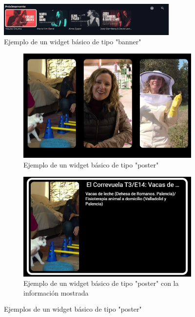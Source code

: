 \begin{figure}[hp!]
    \centering
    \includegraphics[width=0.8\textwidth]{imaxes/Widget_banner.png}
    \caption{Ejemplo de un widget básico de tipo "banner"}
    \label{fig:Widget_banner}
\end{figure}
\begin{figure}[hp!]
    \begin{subfigure}[c]{0.5\textwidth}
        \includegraphics[width=\textwidth]{imaxes/Widget_poster.png}
        \caption{Ejemplo de un widget básico de tipo "poster"}
        \label{fig:Widget_destacado}
    \end{subfigure}
    \hspace{0.1\textwidth}
    \begin{subfigure}[c]{0.5\textwidth}
        \includegraphics[width=\textwidth]{imaxes/Widget_poster_abierto.png}
        \caption{Ejemplo de un widget básico de tipo "poster" con la información mostrada}
        \label{fig:Widget_poster}
    \end{subfigure}
    \caption{Ejemplos de un widget básico de tipo "poster"}
    \label{fig:Widget_poster}
\end{figure}
